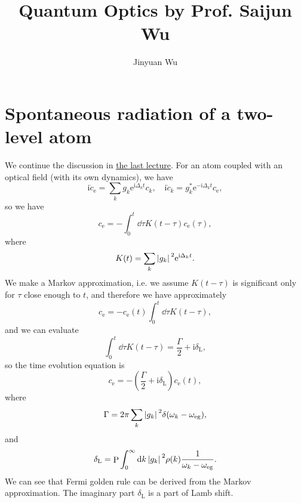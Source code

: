 \documentclass[hyperref, a4paper]{article}
\title{Quantum Optics by Prof. Saijun Wu}
\author{Jinyuan Wu}
\DeclareMathOperator{\primevalue}{P}
\newcommand*{\ii}{\mathrm{i}}
\newcommand*{\ee}{\mathrm{e}}
\begin{document}
\maketitle

\section{Spontaneous radiation of a two-level atom}

We continue the discussion in \href{11-18.pdf}{the last lecture}.
For an atom coupled with an optical field (with its own dynamics), we have 
\[
    \ii \dot{c}_\text{e} = \sum_k g_k \ee^{\ii \Delta_k t} c_k, \quad 
    \ii \dot{c}_k = g_k^* \ee^{- \ii \Delta_k t} c_\text{e},
\]
so we have 
\begin{equation}
    c_\text{e} = - \int_0^t \dd{\tau} K(t - \tau) c_\text{e}(\tau),
\end{equation}
where 
\begin{equation}
    K(t) = \sum_k \abs*{g_k}^2 \ee^{\ii \Delta_k t}.
\end{equation}
We make a Markov approximation, i.e. we assume $K(t - \tau)$ is significant only for $\tau$ close enough to $t$,
and therefore we have approximately
\[
    c_\text{e} = - c_\text{e}(t) \int_0^t \dd{\tau} K(t - \tau),
\]
and we can evaluate 
\[
    \int_0^t \dd{\tau} K(t - \tau) = \frac{\Gamma}{2} + \ii \delta_\text{L},
\]
so the time evolution equation is 
\begin{equation}
    c_\text{e} = - \left( \frac{\Gamma}{2} + \ii \delta_\text{L} \right) c_\text{e}(t) ,
    \label{eq:markov-eq}
\end{equation}
where 
\begin{equation}
    \Gamma = 2 \pi \sum_k \abs*{g_k}^2 \delta(\omega_k - \omega_\text{eg}),
\end{equation}
and 
\begin{equation}
    \delta_\text{L} = \primevalue \int_0^\infty \dd{k} \abs*{g_k}^2 \rho(k) \frac{1}{\omega_k - \omega_\text{eg}}.
\end{equation}
We can see that Fermi golden rule can be derived from the Markov approximation.
The imaginary part $\delta_\text{L}$ is a part of Lamb shift.
\end{document}
